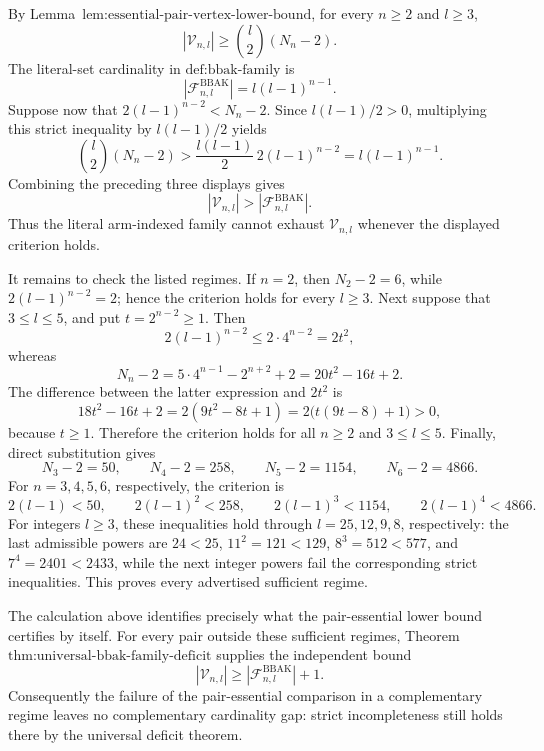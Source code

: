 By Lemma~\(\text{lem:essential-pair-vertex-lower-bound}\), for every \(n\ge 2\) and \(l\ge 3\),
\[
|\mathcal V_{n,l}|\ge \binom{l}{2}(N_n-2).
\]
The literal-set cardinality in \(\text{def:bbak-family}\) is
\[
|\mathcal F^{\mathrm{BBAK}}_{n,l}|=l(l-1)^{n-1}.
\]
Suppose now that \(2(l-1)^{n-2}<N_n-2\). Since \(l(l-1)/2>0\), multiplying this strict inequality by \(l(l-1)/2\) yields
\[
\binom{l}{2}(N_n-2)>\frac{l(l-1)}{2}\,2(l-1)^{n-2}=l(l-1)^{n-1}.
\]
Combining the preceding three displays gives
\[
|\mathcal V_{n,l}|>|\mathcal F^{\mathrm{BBAK}}_{n,l}|.
\]
Thus the literal arm-indexed family cannot exhaust \(\mathcal V_{n,l}\) whenever the displayed criterion holds.

It remains to check the listed regimes. If \(n=2\), then \(N_2-2=6\), while \(2(l-1)^{n-2}=2\); hence the criterion holds for every \(l\ge3\). Next suppose that \(3\le l\le5\), and put \(t=2^{n-2}\ge1\). Then
\[
2(l-1)^{n-2}\le2\cdot4^{n-2}=2t^2,
\]
whereas
\[
N_n-2=5\cdot4^{n-1}-2^{n+2}+2=20t^2-16t+2.
\]
The difference between the latter expression and \(2t^2\) is
\[
18t^2-16t+2=2(9t^2-8t+1)=2\bigl(t(9t-8)+1\bigr)>0,
\]
because \(t\ge1\). Therefore the criterion holds for all \(n\ge2\) and \(3\le l\le5\). Finally, direct substitution gives
\[
N_3-2=50,\qquad N_4-2=258,\qquad N_5-2=1154,\qquad N_6-2=4866.
\]
For \(n=3,4,5,6\), respectively, the criterion is
\[
2(l-1)<50,\qquad 2(l-1)^2<258,\qquad 2(l-1)^3<1154,\qquad 2(l-1)^4<4866.
\]
For integers \(l\ge3\), these inequalities hold through \(l=25,12,9,8\), respectively: the last admissible powers are \(24<25\), \(11^2=121<129\), \(8^3=512<577\), and \(7^4=2401<2433\), while the next integer powers fail the corresponding strict inequalities. This proves every advertised sufficient regime.

The calculation above identifies precisely what the pair-essential lower bound certifies by itself. For every pair outside these sufficient regimes, Theorem~\(\text{thm:universal-bbak-family-deficit}\) supplies the independent bound
\[
|\mathcal V_{n,l}|\ge |\mathcal F^{\mathrm{BBAK}}_{n,l}|+1.
\]
Consequently the failure of the pair-essential comparison in a complementary regime leaves no complementary cardinality gap: strict incompleteness still holds there by the universal deficit theorem.